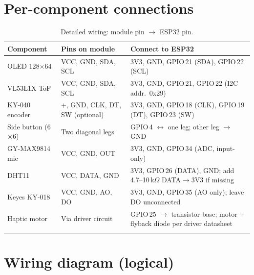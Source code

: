 \documentclass[11pt,a4paper]{report}
\begin{document}
\section{Per-component connections}

\begin{longtable}{@{}p{2.6cm}p{3.8cm}p{6.8cm}@{}}
\toprule
\textbf{Component} & \textbf{Pins on module} & \textbf{Connect to ESP32} \\
\midrule
\endhead
OLED 128$\times$64 &
VCC, GND, SDA, SCL &
3V3, GND, GPIO\,21 (SDA), GPIO\,22 (SCL) \\
VL53L1X ToF &
VCC, GND, SDA, SCL &
3V3, GND, GPIO\,21, GPIO\,22 (I2C addr.\ 0x29) \\
KY-040 encoder &
+, GND, CLK, DT, SW (optional) &
3V3, GND, GPIO\,18 (CLK), GPIO\,19 (DT), GPIO\,23 (SW) \\
Side button (6$\times$6) &
Two diagonal legs &
GPIO\,4 $\leftrightarrow$ one leg; other leg $\rightarrow$ GND \\
GY-MAX9814 mic &
VCC, GND, OUT &
3V3, GND, GPIO\,34 (ADC, input-only) \\
DHT11 &
VCC, DATA, GND &
3V3, GPIO\,26 (DATA), GND; add 4.7--10\,k$\Omega$ DATA$\rightarrow$3V3 if missing \\
Keyes KY-018 &
VCC, GND, AO, DO &
3V3, GND, GPIO\,35 (AO only); leave DO unconnected \\
Haptic motor &
Via driver circuit &
GPIO\,25 $\rightarrow$ transistor base; motor + flyback diode per driver datasheet \\
\bottomrule
\caption{Detailed wiring: module pin $\rightarrow$ ESP32 pin.}
\end{longtable}

\section{Wiring diagram (logical)}
\end{document}
